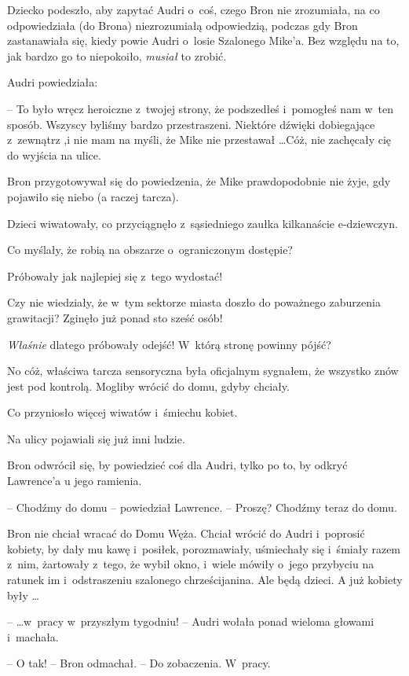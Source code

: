 \documentclass[oneside,polish,11pt,rmheadings]{mwbk}
\begin{document}
Dziecko podeszło, aby zapytać Audri o~coś, czego Bron nie zrozumiała, na co odpowiedziała (do Brona) niezrozumiałą odpowiedzią, podczas gdy Bron zastanawiała się, kiedy powie Audri o~losie Szalonego Mike'a. Bez względu na to, jak bardzo go to niepokoiło, \textit{musiał }to zrobić. 

Audri powiedziała: 

-- To było wręcz heroiczne z~twojej strony, że podszedłeś i~pomogłeś nam w~ten sposób. Wszyscy byliśmy bardzo przestraszeni. Niektóre dźwięki dobiegające z~zewnątrz ,i nie mam na myśli, że Mike nie przestawał \ldots   Cóż, nie zachęcały cię do wyjścia na ulice. 

Bron przygotowywał się do powiedzenia, że Mike prawdopodobnie nie żyje, gdy pojawiło się niebo (a raczej tarcza). 

Dzieci wiwatowały, co przyciągnęło z~sąsiedniego zaułka kilkanaście e-dziewczyn. 

Co myślały, że robią na obszarze o~ograniczonym dostępie? 

Próbowały jak najlepiej się z~tego wydostać! 

Czy nie wiedziały, że w~tym sektorze miasta doszło do poważnego zaburzenia grawitacji? Zginęło już ponad sto sześć osób! 

\textit{Właśnie }dlatego próbowały odejść! W~którą stronę powinny pójść? 

No cóż, właściwa tarcza sensoryczna była oficjalnym sygnałem, że wszystko znów jest pod kontrolą. Mogliby wrócić do domu, gdyby chciały. 

Co przyniosło więcej wiwatów i~śmiechu kobiet. 

Na ulicy pojawiali się już inni ludzie. 

Bron odwrócił się, by powiedzieć coś dla Audri, tylko po to, by odkryć Lawrence'a u jego ramienia. 

-- Chodźmy do domu -- powiedział Lawrence. -- Proszę? Chodźmy teraz do domu. 

Bron nie chciał wracać do Domu Węża. Chciał wrócić do Audri i~poprosić kobiety, by dały mu kawę i~posiłek, porozmawiały, uśmiechały się i~śmiały razem z~nim, żartowały z~tego, że wybił okno, i~wiele mówiły o~jego przybyciu na ratunek im i~odstraszeniu szalonego chrześcijanina. Ale będą dzieci. A już kobiety były \ldots  

--  \ldots  w~pracy w~przyszłym tygodniu! --  Audri wołała ponad wieloma głowami i~machała. 

-- O tak! --  Bron odmachał. -- Do zobaczenia. W~pracy. 
\end{document}
